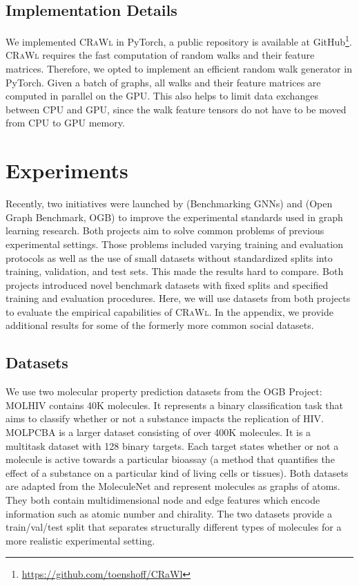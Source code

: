 \documentclass{scrartcl} \usepackage[dvipsnames]{xcolor}
\newcommand{\crawl}{\textsc{CRaWl}}
\begin{document}
\subsection{Implementation Details}
\label{subsec:implementationDetails}
    We implemented \crawl{} in PyTorch, a public repository is available at GitHub\footnote{\url{https://github.com/toenshoff/CRaWl}}.
    \crawl{} requires the fast computation of random walks and their feature matrices.
    Therefore, we opted to implement an efficient random walk generator in PyTorch.
    Given a batch of graphs, all walks and their feature matrices are computed in parallel on the GPU.
    This also helps to limit data exchanges between CPU and GPU, since the walk feature tensors do not have to be moved from CPU to GPU memory.


    
         \section{Experiments}
\label{experiments}
Recently, two initiatives were launched by \citet{dwivedi2020benchmarkgnns} (Benchmarking GNNs) and \citet{hu2020ogb} (Open Graph Benchmark, OGB) to improve the experimental standards used in graph learning research.
Both projects aim to solve common problems of previous experimental settings.
Those problems included varying training and evaluation protocols as well as the use of small datasets without standardized splits into training, validation, and test sets.
This made the results hard to compare.
Both projects introduced novel benchmark datasets with fixed splits and specified training and evaluation procedures.
Here, we will use datasets from both projects to evaluate the empirical capabilities of \crawl{}.
In the appendix, we provide additional results for some of the formerly more common social datasets.

\subsection{Datasets}
We use two molecular property prediction datasets from the OGB Project: 
MOLHIV contains 40K molecules.
It represents a binary classification task that aims to classify whether or not a substance impacts the replication of HIV.
MOLPCBA is a larger dataset consisting of over 400K molecules.
It is a multitask dataset with 128 binary targets.
Each target states whether or not a molecule is active towards a particular bioassay (a method that quantifies the effect of a substance on a particular kind of living cells or tissues).
Both datasets are adapted from the MoleculeNet \cite{wu2018moleculenet} and represent molecules as graphs of atoms.
They both contain multidimensional node and edge features which encode information such as atomic number and chirality.
The two datasets provide a train/val/test split that separates structurally different types of molecules for a more realistic experimental setting.
\end{document}
